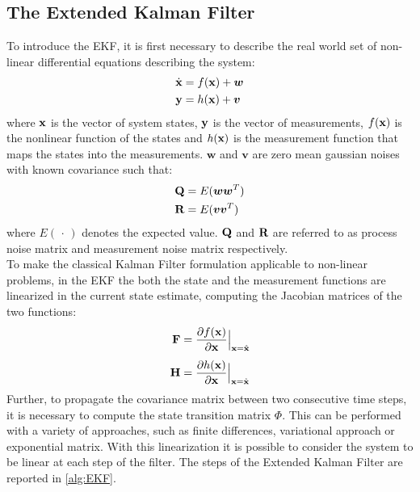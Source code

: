 \subsection{The Extended Kalman Filter}
To introduce the EKF, it is first necessary to describe the real world set of non-linear differential equations describing the system:
\begin{align}
    \label{eq:EKF1}
    \dot{\mathrm{\textbf{x}}} & = f(\mathrm{\textbf{x}}) + \boldsymbol{w}\\
    \label{eq:EKF2}
    \mathrm{\textbf{y}} & = h(\mathrm{\textbf{x}}) + \boldsymbol{v}
\end{align}
where $\mathrm{\textbf{x}}$ is the vector of system states, $\mathrm{\textbf{y}}$ is the vector of measurements, $f(\mathrm{\textbf{x}})$ is the nonlinear function of the states and $h(\mathrm{\textbf{x}})$ is the measurement function that maps the states into the measurements. $\boldsymbol{w}$ and $\boldsymbol{v}$ are zero mean gaussian noises with known covariance such that:
\begin{align}
    \label{eq:COV1}
    \mathrm{\textbf{Q}}& = E(\boldsymbol{w}\boldsymbol{w}^T)\\
    \label{eq:COV2}
    \mathrm{\textbf{R}}& = E(\boldsymbol{v}\boldsymbol{v}^T)
\end{align}
where $E(\,\cdot\,)$ denotes the expected value. $\mathrm{\textbf{Q}}$ and $\mathrm{\textbf{R}}$ are referred to as process noise matrix and measurement noise matrix respectively. \\
To make the classical Kalman Filter formulation applicable to non-linear problems, in the EKF the both the state and the measurement functions are linearized in the current state estimate, computing the Jacobian matrices of the two functions:
\begin{align}
\label{eq:DER1}
    \mathrm{\textbf{F}}& = \dfrac{\partial f(\mathrm{\textbf{x}})}{\partial \mathrm{\textbf{x}}}\Big\vert_{\mathrm{\textbf{x}} = \hat{\mathrm{\textbf{x}}}}\\[1ex]\label{eq:DER2}
    \mathrm{\textbf{H}}& = \dfrac{\partial h(\mathrm{\textbf{x}})}{\partial \mathrm{\textbf{x}}}\Big\vert_{\mathrm{\textbf{x}} = \hat{\mathrm{\textbf{x}}}}
\end{align}
Further, to propagate the covariance matrix between two consecutive time steps, it is necessary to compute the state transition matrix $\Phi$. This can be performed with a variety of approaches, such as finite differences, variational approach or exponential matrix. 
With this linearization it is possible to consider the system to be linear at each step of the filter. The steps of the Extended Kalman Filter are reported in \cref{alg:EKF}.

